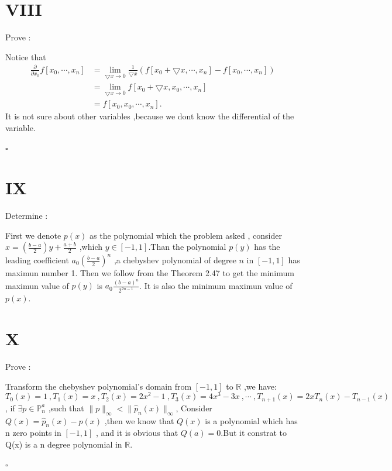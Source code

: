 \documentclass[a4paper]{article}
\begin{document}
\section*{VIII}
Prove :

Notice that 
\begin{align}
    \frac{\partial}{ \partial x_{0}}f[x_{0},\cdots,x_{n}] &=  
    \lim_{\bigtriangledown x \to 0} \frac{1}{\bigtriangledown x}(f[x_{0}+\bigtriangledown x,\cdots,x_{n}]-f[x_{0},\cdots,x_{n}])\\
    &= \lim_{\bigtriangledown x \to 0}f[x_{0}+\bigtriangledown x,x_{0},\cdots,x_{n}]\\    
    &=f[x_{0},x_{0},\cdots,x_{n}].
\end{align}
It is not sure about other variables ,because we dont know the differential of the variable.
\begin{flushright} 
    $\square$ 
\end{flushright} 


\section*{IX}
Determine :

First we denote $p(x)$ as the polynomial which the problem asked ,
consider $x=(\frac{b-a}{2})y+\frac{a+b}{2}$ ,which $y\in [-1,1]$.Than the polynomial $p(y)$ has the leading coefficient
$a_{0}(\frac{b-a}{2})^{n}$ ,a chebyshev polynomial of degree $n$ in $[-1,1]$ has maximun number 1.
Then we follow from the Theorem 2.47 to get the minimum maximun value of $p(y)$ is $a_{0}\frac{(b-a)^{n}}{2^{2n-1}}$.
It is also the minimum maximun value of $p(x)$.


\section*{X}
Prove :

Transform the chebyshev polynomial's domain from $[-1,1]$ to $\mathbb{R} $ ,we have:
$$T_{0}(x)=1\ ,T_{1}(x)=x\ ,T_{2}(x)=2x^{2}-1\ ,T_{3}(x)=4x^{3}-3x\ ,\cdots\ ,T_{n+1}(x)=2xT_{n}(x)-T_{n-1}(x)$$,
if $\exists p \in \mathbb{P} _{n}^{a} $ ,such that $\|p\|_{\infty }<\|\widehat{p}_{n}(x)\|_{\infty } $,
Consider $Q(x)=\widehat{p}_{n}(x)-p(x) $ ,then we know that $Q(x)$ is a polynomial which has n zero points in $[-1,1]$ ,
and it is obvious that $Q(a)=0$.But it constrat to Q(x) is a n degree polynomial in $\mathbb{R} $.
\begin{flushright} 
    $\square$ 
\end{flushright} 
\end{document}
